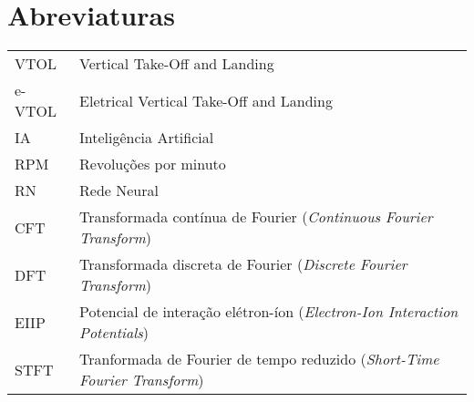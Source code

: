 \chapter{Abreviaturas}

\begin{tabular}{ll}

    VTOL        & Vertical Take-Off and Landing\\
    e-VTOL      & Eletrical Vertical Take-Off and Landing\\
    IA          & Inteligência Artificial\\
    RPM         & Revoluções por minuto\\
    RN          & Rede Neural\\

    CFT         & Transformada contínua de Fourier (\emph{Continuous Fourier Transform})\\
    DFT         & Transformada discreta de Fourier (\emph{Discrete Fourier Transform})\\
    EIIP        & Potencial de interação elétron-íon (\emph{Electron-Ion Interaction Potentials})\\
    STFT        & Tranformada de Fourier de tempo reduzido (\emph{Short-Time Fourier Transform})\\
    
\end{tabular}